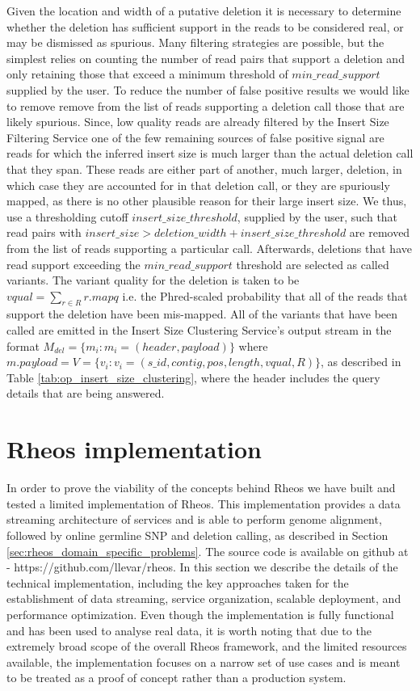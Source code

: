 Given the location and width of a putative deletion it is necessary to determine whether the deletion has sufficient support in the reads to be considered real, or may be dismissed as spurious. Many filtering strategies are possible, but the simplest relies on counting the number of read pairs that support a deletion and only retaining those that exceed a minimum threshold of $min\_read\_support$ supplied by the user. To reduce the number of false positive results we would like to remove remove from the list of reads supporting a deletion call those that are likely spurious. Since, low quality reads are already filtered by the Insert Size Filtering Service one of the few remaining sources of false positive signal are reads for which the inferred insert size is much larger than the actual deletion call that they span. These reads are either part of another, much larger, deletion, in which case they are accounted for in that deletion call, or they are spuriously mapped, as there is no other plausible reason for their large insert size. We thus, use a thresholding cutoff $insert\_size\_threshold$, supplied by the user, such that read pairs with $insert\_size > deletion\_width + insert\_size\_threshold$ are removed from the list of reads supporting a particular call. Afterwards, deletions that have read support exceeding the $min\_read\_support$ threshold are selected as called variants. 
\newpage
The variant quality for the deletion is taken to be $vqual = \sum_{r \in R}{r.mapq}$ i.e. the Phred-scaled probability that all of the reads that support the deletion have been mis-mapped. All of the variants that have been called are emitted in the Insert Size Clustering Service's output stream in the format $M_{del} = \{m_i: m_i = (header, payload)\}$ where $m.payload = V = \{v_i: v_i = (s\_id, contig, pos, length, vqual, R)\}$, as described in Table \ref{tab:op_insert_size_clustering}, where the header includes the query details that are being answered.


\section{Rheos implementation}\label{sec:rheos_implementation}

In order to prove the viability of the concepts behind Rheos we have built and tested a limited implementation of Rheos. This implementation provides a data streaming architecture of services and is able to perform genome alignment, followed by online germline SNP and deletion calling, as described in Section \ref{sec:rheos_domain_specific_problems}. The source code is available on github at - https://github.com/llevar/rheos. In this section we describe the details of the technical implementation, including the key approaches taken for the establishment of data streaming, service organization, scalable deployment, and performance optimization. Even though the implementation is fully functional and has been used to analyse real data, it is worth noting that due to the extremely broad scope of the overall Rheos framework, and the limited resources available, the implementation focuses on a narrow set of use cases and is meant to be treated as a proof of concept rather than a production system.

